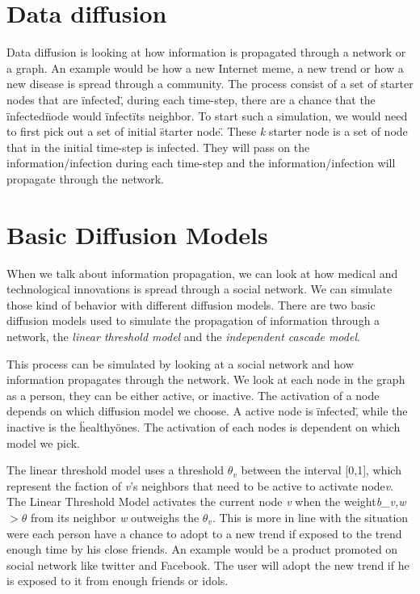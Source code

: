 \section{Data diffusion}
Data diffusion is looking at how information is propagated through a network or a graph. An example would be how a new Internet meme, a new trend or how a new disease is spread through a community. The process consist of a set of starter nodes that are \"infected\", during each time-step, there are a chance that the \"infected\" node would \"infect\" its neighbor. To start such a simulation, we would need to first pick out a set of initial \"starter node\". These {\it k} starter node is a set of node that in the initial time-step is infected. They will pass on the information/infection during each time-step and the information/infection will propagate through the network.

\section{Basic Diffusion Models}
When we talk about information propagation, we can look at how medical and technological innovations is spread through a social network. We can simulate those kind of behavior with different diffusion models. There are two basic diffusion models used to simulate the propagation of information through a network\cite{MaximizeSpread2003}, the {\it linear threshold model} and the {\it independent cascade model}\cite{MaximizeSpread2003}.

This process can be simulated by looking at a social network and how information propagates through the network. We look at each node in the graph as a person, they can be either active, or inactive. The activation of a node depends on which diffusion model we choose. A active node is \"infected\", while the inactive is the \"healthy\" ones. The activation of each nodes is dependent on which model we pick.

The linear threshold model uses a threshold $\theta_v$ between the interval [0,1], which represent the faction of {\it v}'s neighbors that need to be active to activate node{\it v}. The Linear Threshold Model activates the current node {\it v} when the weight{\it b_{v,w}} $> \theta$ from its neighbor {\it w} outweighs the $\theta_v$. This is more in line with the situation were each person have a chance to adopt to a new trend if exposed to the trend enough time by his close friends. An example would be a product promoted on social network like twitter and Facebook. The user will adopt the new trend if he is exposed to it from enough friends or idols. 

